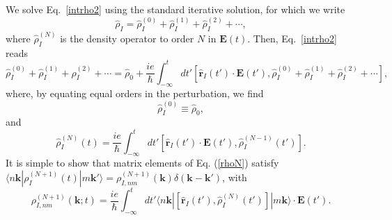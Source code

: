 We solve Eq.~\eqref{intrho2} using the standard iterative
solution, for which we write
\begin{equation}\label{rhop}
\hat{\rho}_{I} = \hat{\rho}_{I}^{(0)} + \hat{\rho}_{I}^{(1)} + \hat{\rho}_{I}^{(2)} + \cdots
,
\end{equation}
where $\hat{\rho}_{I}^{(N)}$ is the density operator to order $N$ in $\mathbf{E}(t)$.
Then, Eq.~\eqref{intrho2} reads
\begin{equation}\label{intrho3}
\hat{\rho}_{I}^{(0)} + \hat{\rho}_{I}^{(1)} + \hat{\rho}_{I}^{(2)} + \cdots
= \hat{\rho}_{0}
+
\frac{ie}{\hbar}\int_{-\infty}^t dt'[\hat{\mathbf{r}}_I(t')\cdot\mathbf{E}(t'),
\hat{\rho}_I^{(0)}+\hat{\rho}_I^{(1)}+\hat{\rho}_I^{(2)}+\cdots
]
,
\end{equation}
where, by equating equal orders in the perturbation, we find
\begin{equation}\label{rho0}
\hat{\rho}_I^{(0)}\equiv\hat{\rho}_0
,
\end{equation}
and
\begin{equation}\label{rhoN}
\hat{\rho}_I^{(N)}(t)=
\frac{ie}{\hbar}
\int_{-\infty}^t dt'[\hat{\mathbf{r}}_I(t')\cdot\mathbf{E}(t'),\hat{\rho}^{(N-1)}_I(t')].
\end{equation}
It is simple to show that matrix elements of Eq. (\ref{rhoN}) satisfy
$\langle n\mathbf{k}| \rho_I^{(N+1)}(t) |m\mathbf{k}'\rangle = \rho^{(N+1)}_{I,nm}(\mathbf{k})\delta(\mathbf{k}-\mathbf{k}')$,
with
\begin{equation}\label{rtilde}
\rho^{(N+1)}_{I,nm}(\mathbf{k};t)
=\frac{ie}{\hbar}\int_{-\infty}^t dt'
\langle n\mathbf{k}|
[\hat{\mathbf{r}}_I(t'),\hat{\rho}^{(N)}_I(t')]
|m\mathbf{k}\rangle
\cdot\mathbf{E}(t')
.
\end{equation}


